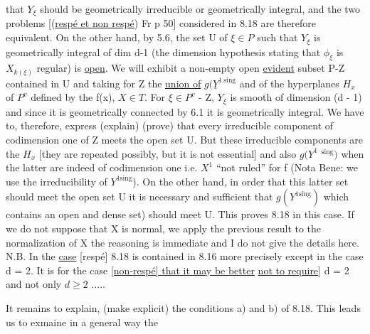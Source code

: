 \documentclass[11pt]{article}
\newcommand{\scanpage}[1]{\par\bigskip\noindent{\small\sffamily[scan #1]}\par}
\newcommand{\mspage}[1]{{\small\sffamily[p.\,#1]}}
\newcommand{\uline}[1]{\underline{#1}}
\begin{document}
that $Y_{\xi}$ should be geometrically irreducible or geometrically
integral, and the two problems [(\uline{respé et non respé}) Fr p 50]
considered in 8.18 are therefore equivalent. On the other hand,
by 5.6, the set U of $\xi \in P$ such that $Y_{\xi}$ is geometrically integral
of dim d-1 (the dimension hypothesis stating that $\phi_{\xi}$ is $X_{k(\xi)}$
regular) is \uline{open}. We will exhibit a non-empty open \uline{evident} subset
P-Z contained in U and taking for Z the \uline{union of} $g(\underline{Y}^{1\ \mathrm{sing}}$ and of
the hyperplanes $H_{x}$ of $P^{v}$ defined by the f(x), $X \in T$. For $\xi \in P^{v}$ -
Z, $Y_{\xi}$ is smooth of dimension
(d - 1) and since it is geometrically connected by 6.1 it is
geometrically integral. We have to, therefore, express (explain)
(prove) that every irreducible component of codimension one of Z
meets the open set U. But these irreducible components are the $H_{x}$
[they are repeated possibly, but it is not essential] and also $g(Y^{1}$
$^{\mathrm{sing}})$ when the latter are indeed of codimension one i.e. $X^{1}$ ``not
ruled'' for f (Nota Bene: we use the irreducibility of $Y^{1\mathrm{sing}}$). On
the other hand, in order that this latter set should meet the open
set U it is necessary and sufficient that $g(Y^{1\mathrm{sing}})$ which contains
an open and dense set) should meet U. This proves 8.18 in this
case. If we do not suppose that X is normal, we apply the
previous result to the normalization of X the reasoning is
immediate and I do not give the details here. N.B. In the \uline{case}
[respé] 8.18 is contained in 8.16 more precisely except in the
case d = 2. It is for the case \uline{[non-respé] that it may be better}
\uline{not to require]} d = 2 and not only $d \geq 2$ .....

It remains to explain, (make explicit) the conditions a) and
b) of 8.18. This leads us to exmaine in a general way the

\clearpage
\scanpage{24/60}
\mspage{60}
\end{document}
